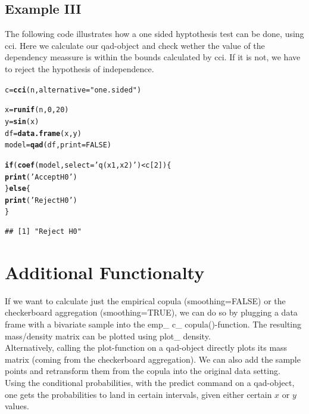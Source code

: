 \documentclass{scrartcl}\usepackage[]{graphicx}\usepackage[]{color}
\makeatletter
\newcommand{\hlnum}[1]{\textcolor[rgb]{0.686,0.059,0.569}{#1}}%
\newcommand{\hlstr}[1]{\textcolor[rgb]{0.192,0.494,0.8}{#1}}%
\newcommand{\hlopt}[1]{\textcolor[rgb]{0,0,0}{#1}}%
\newcommand{\hlstd}[1]{\textcolor[rgb]{0.345,0.345,0.345}{#1}}%
\newcommand{\hlkwa}[1]{\textcolor[rgb]{0.161,0.373,0.58}{\textbf{#1}}}%
\newcommand{\hlkwb}[1]{\textcolor[rgb]{0.69,0.353,0.396}{#1}}%
\newcommand{\hlkwc}[1]{\textcolor[rgb]{0.333,0.667,0.333}{#1}}%
\newcommand{\hlkwd}[1]{\textcolor[rgb]{0.737,0.353,0.396}{\textbf{#1}}}%
\newenvironment{kframe}{%
 \def\at@end@of@kframe{}%
 \ifinner\ifhmode%
  \def\at@end@of@kframe{\end{minipage}}%
  \begin{minipage}{\columnwidth}%
 \fi\fi%
 \def\FrameCommand##1{\hskip\@totalleftmargin \hskip-\fboxsep
 \colorbox{shadecolor}{##1}\hskip-\fboxsep
     \hskip-\linewidth \hskip-\@totalleftmargin \hskip\columnwidth}%
 \MakeFramed {\advance\hsize-\width
   \@totalleftmargin\z@ \linewidth\hsize
   \@setminipage}}%
 {\par\unskip\endMakeFramed%
 \at@end@of@kframe}
\newenvironment{knitrout}{}{} %
\makeatother
\begin{document}
\subsection{Example III}
The following code illustrates how a one sided hyptothesis test can be done, using cci. Here we calculate our qad-object and check wether the value
of the dependency meassure is within the bounds calculated by cci. If it is not, we have to reject the hypothesis of independence.
\begin{knitrout}
\color{fgcolor}\begin{kframe}
\begin{alltt}
\hlstd{c} \hlkwb{=} \hlkwd{cci}\hlstd{(n,} \hlkwc{alternative} \hlstd{=} \hlstr{"one.sided"}\hlstd{)}

\hlstd{x} \hlkwb{=} \hlkwd{runif}\hlstd{(n,}\hlnum{0}\hlstd{,}\hlnum{20}\hlstd{)}
\hlstd{y} \hlkwb{=} \hlkwd{sin}\hlstd{(x)}
\hlstd{df} \hlkwb{=} \hlkwd{data.frame}\hlstd{(x,y)}
\hlstd{model} \hlkwb{=} \hlkwd{qad}\hlstd{(df,}\hlkwc{print}\hlstd{=}\hlnum{FALSE}\hlstd{)}

\hlkwa{if}\hlstd{(}\hlkwd{coef}\hlstd{(model,} \hlkwc{select} \hlstd{=} \hlstr{'q(x1,x2)'}\hlstd{)} \hlopt{<} \hlstd{c[}\hlnum{2}\hlstd{])\{}
 \hlkwd{print}\hlstd{(}\hlstr{'Accept H0'}\hlstd{)}
\hlstd{\}}\hlkwa{else}\hlstd{\{}
 \hlkwd{print}\hlstd{(}\hlstr{'Reject H0'}\hlstd{)}
\hlstd{\}}
\end{alltt}
\begin{verbatim}
## [1] "Reject H0"
\end{verbatim}
\end{kframe}
\end{knitrout}

\section{Additional Functionalty}

If we want to calculate just the empirical copula (smoothing=FALSE) or the checkerboard aggregation (smoothing=TRUE), we can do so by plugging a data frame with a bivariate sample into the emp\_ c\_ copula()-function. The resulting mass/density matrix can be plotted using plot\_ density.\\
Alternatively, calling the plot-function on a qad-object directly plots its mass matrix (coming from the checkerboard aggregation). We can also add the sample points and retransform them from the copula into the original data setting.\\
Using the conditional probabilities, with the predict command on a qad-object, one gets the probabilities to land in certain intervals, given either certain $x$ or $y$ values.
\end{document}
